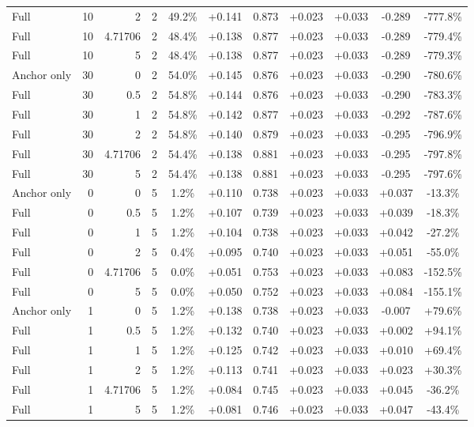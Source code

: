 \begin{table}[htbp]
\begin{tabular}{lrrrccccccc}
Full & 10 & 2 & 2 & 49.2\% & +0.141 & 0.873 & +0.023 & +0.033 & -0.289 & -777.8\% \\
Full & 10 & 4.71706 & 2 & 48.4\% & +0.138 & 0.877 & +0.023 & +0.033 & -0.289 & -779.4\% \\
Full & 10 & 5 & 2 & 48.4\% & +0.138 & 0.877 & +0.023 & +0.033 & -0.289 & -779.3\% \\
Anchor only & 30 & 0 & 2 & 54.0\% & +0.145 & 0.876 & +0.023 & +0.033 & -0.290 & -780.6\% \\
Full & 30 & 0.5 & 2 & 54.8\% & +0.144 & 0.876 & +0.023 & +0.033 & -0.290 & -783.3\% \\
Full & 30 & 1 & 2 & 54.8\% & +0.142 & 0.877 & +0.023 & +0.033 & -0.292 & -787.6\% \\
Full & 30 & 2 & 2 & 54.8\% & +0.140 & 0.879 & +0.023 & +0.033 & -0.295 & -796.9\% \\
Full & 30 & 4.71706 & 2 & 54.4\% & +0.138 & 0.881 & +0.023 & +0.033 & -0.295 & -797.8\% \\
Full & 30 & 5 & 2 & 54.4\% & +0.138 & 0.881 & +0.023 & +0.033 & -0.295 & -797.6\% \\
Anchor only & 0 & 0 & 5 & 1.2\% & +0.110 & 0.738 & +0.023 & +0.033 & +0.037 & -13.3\% \\
Full & 0 & 0.5 & 5 & 1.2\% & +0.107 & 0.739 & +0.023 & +0.033 & +0.039 & -18.3\% \\
Full & 0 & 1 & 5 & 1.2\% & +0.104 & 0.738 & +0.023 & +0.033 & +0.042 & -27.2\% \\
Full & 0 & 2 & 5 & 0.4\% & +0.095 & 0.740 & +0.023 & +0.033 & +0.051 & -55.0\% \\
Full & 0 & 4.71706 & 5 & 0.0\% & +0.051 & 0.753 & +0.023 & +0.033 & +0.083 & -152.5\% \\
Full & 0 & 5 & 5 & 0.0\% & +0.050 & 0.752 & +0.023 & +0.033 & +0.084 & -155.1\% \\
Anchor only & 1 & 0 & 5 & 1.2\% & +0.138 & 0.738 & +0.023 & +0.033 & -0.007 & +79.6\% \\
Full & 1 & 0.5 & 5 & 1.2\% & +0.132 & 0.740 & +0.023 & +0.033 & +0.002 & +94.1\% \\
Full & 1 & 1 & 5 & 1.2\% & +0.125 & 0.742 & +0.023 & +0.033 & +0.010 & +69.4\% \\
Full & 1 & 2 & 5 & 1.2\% & +0.113 & 0.741 & +0.023 & +0.033 & +0.023 & +30.3\% \\
Full & 1 & 4.71706 & 5 & 1.2\% & +0.084 & 0.745 & +0.023 & +0.033 & +0.045 & -36.2\% \\
Full & 1 & 5 & 5 & 1.2\% & +0.081 & 0.746 & +0.023 & +0.033 & +0.047 & -43.4\% \\

\end{tabular}
\end{table}
